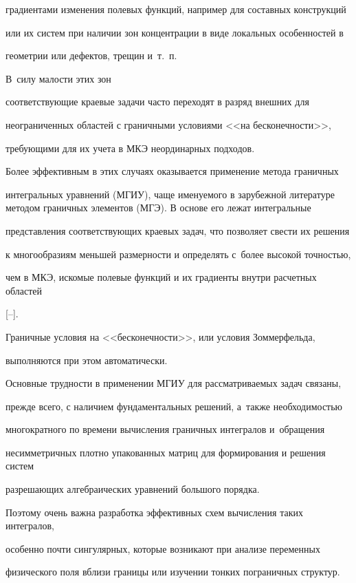 градиентами изменения полевых функций, например для составных конструкций

или их систем при наличии зон концентрации в виде локальных особенностей в

геометрии или дефектов, трещин и~т.~п. 

В~силу малости этих зон

соответствующие краевые задачи часто переходят в разряд внешних для

неограниченных областей с граничными условиями <<на бесконечности>>,

требующими для их учета в МКЭ неординарных подходов.



Более эффективным в этих случаях оказывается применение метода граничных

интегральных уравнений (МГИУ), чаще именуемого в зарубежной литературе методом граничных элементов (МГЭ). В основе его лежат интегральные

представления соответствующих краевых задач, что позволяет свести их решения

к многообразиям меньшей размерности и определять с~более высокой точностью,

чем в МКЭ, искомые полевые функций и их градиенты внутри расчетных областей

[--]. 

Граничные условия на <<бесконечности>>, или условия Зоммерфельда,

выполняются при этом автоматически.



Основные трудности в применении МГИУ для рассматриваемых задач связаны,

прежде всего, с наличием фундаментальных решений, а~также необходимостью

многократного по времени вычисления граничных интегралов и~обращения

несимметричных плотно упакованных матриц для формирования и решения систем

разрешающих алгебраических уравнений большого порядка.



Поэтому очень важна разработка эффективных схем вычисления таких интегралов,

особенно почти сингулярных, которые возникают при анализе переменных

физического поля вблизи границы или изучении тонких пограничных структур. 

